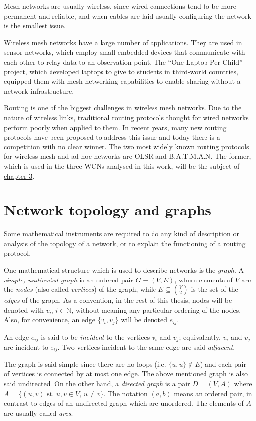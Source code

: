 \documentclass[a4paper,11pt,twoside,openright]{memoir}
\newcommand{\st}{\text{ st. }}
\begin{document}
Mesh networks are usually wireless, since wired connections tend to be
more permanent and reliable, and when cables are laid usually configuring
the network is the smallest issue.

Wireless mesh networks have a large number of applications.
They are used in sensor networks, which employ small embedded devices that
communicate with each other to relay data to an observation point.
The ``One Laptop Per Child'' project, which developed laptops to give to
students in third-world countries, equipped them with mesh networking
capabilities to enable sharing without a network infrastructure.

Routing is one of the biggest challenges in wireless mesh networks. Due
to the nature of wireless links, traditional routing protocols
thought for wired networks perform poorly when applied to them. In
recent years, many new routing protocols have been proposed to address
this issue and today there is a competition with no clear winner. The
two most widely known routing protocols for wireless mesh and ad-hoc
networks are OLSR and B.A.T.M.A.N. The former, which is used in the three
WCNs analysed in this work, will be the subject of
\hyperref[olsr-survey]{chapter 3}.

\chapter{Network topology and graphs}\label{network-topology-and-graphs}

Some mathematical instruments are required to do any kind of description
or analysis of the topology of a network, or to explain the functioning
of a routing protocol.

One mathematical structure which is used to describe networks is the
\emph{graph}. A \emph{simple, undirected graph} is an ordered pair
$G = (V, E)$, where elements of $V$ are the \emph{nodes} (also called
\emph{vertices}) of the graph, while $E \subseteq \binom{V}{2}$ is the set of the
\emph{edges} of the graph. As a convention, in the rest of this thesis,
nodes will be denoted with $v_i$, $i \in \mathbb{N}$, without meaning any
particular ordering of the nodes. Also, for convenience, an edge
$\{v_i, v_j \}$ will be denoted $e_{ij}$.

An edge $e_{ij}$ is said to be \emph{incident} to the vertices $v_i$ and
$v_j$; equivalently, $v_i$ and $v_j$ are incident to $e_{ij}$. Two
vertices incident to the same edge are said \emph{adjacent}.

The graph is said simple since there are no loops (i.e.
$\{u,u\} \not\in E$) and each pair of vertices is connected by at most
one edge. The above mentioned graph is also said undirected. On the
other hand, a \emph{directed graph} is a pair $D = (V, A)$ where
$A = \{(u,v) \st u,v \in V,\, u \neq v\}$. The notation $(a,b)$ means
an ordered pair, in contrast to edges of an undirected graph
which are unordered. The elements of $A$ are
usually called \emph{arcs}.
\end{document}
